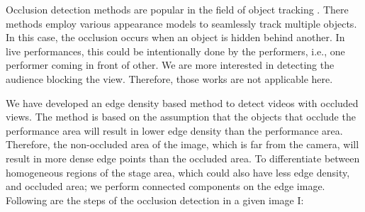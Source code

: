 \documentclass{sig-alternate}
\begin{document}
Occlusion detection methods are popular in the field of object tracking \cite{13, 19}. There methods employ various appearance models to seamlessly track multiple objects. In this case, the occlusion
occurs when an object is hidden behind another. In live performances, this could be intentionally done by the performers, i.e., one performer coming in front of other. We are more interested in detecting the audience blocking the view. Therefore, those works are not applicable here.

We have developed an edge density based method to detect videos with occluded views. The method is based on the assumption that the objects that occlude the performance area will result in lower
edge density than the performance area. Therefore, the non-occluded area of the image, which is far from the camera, will result in more dense edge points than the occluded area. To differentiate between homogeneous regions of the stage area, which could also have less edge density, and occluded area; we perform connected components on the edge image. Following are the steps of the occlusion
detection in a given image I:
\end{document}
